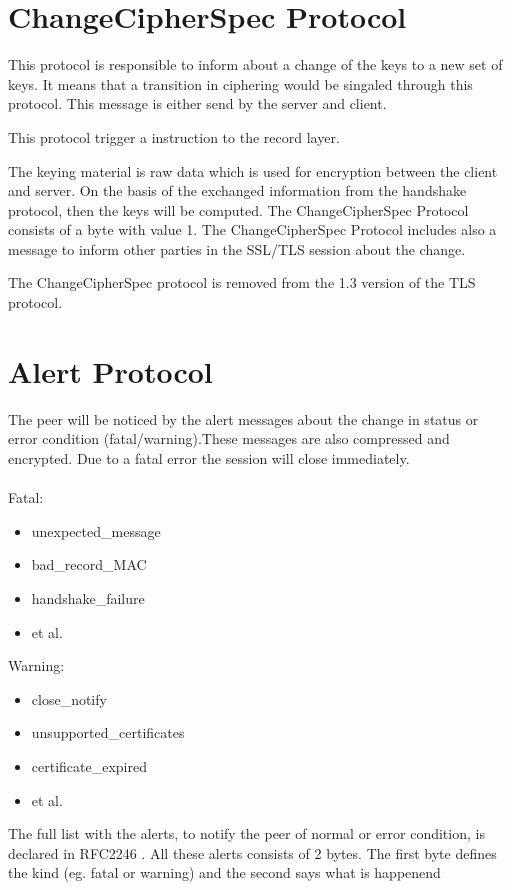 \section{ChangeCipherSpec Protocol}
\label{sec:changeciphfer_protocol}
This protocol is responsible to inform about a change of the keys to a new set of keys. It means that a transition in ciphering would be singaled through this protocol. This message is either send by the server and client. 

This protocol trigger a instruction to the record layer.

The keying material is raw data which is used for encryption between the client and server. On the basis of the exchanged information from the handshake protocol, then the keys will be computed.
The ChangeCipherSpec Protocol consists of a byte with value 1.
The ChangeCipherSpec Protocol includes also a message to inform other parties in the SSL/TLS session about the change.   \cite{ms:overview}

The ChangeCipherSpec protocol is removed from the 1.3 version of the TLS protocol.

\section{Alert Protocol}
\label{sec:alert_protocol}
The peer will be noticed by the alert messages about the change in status or error condition (fatal/warning).These messages are also compressed and encrypted. Due to a fatal error the session will close immediately.\\\\ 
Fatal:
\begin{itemize}
	\item unexpected\_message
	 \item bad\_record\_MAC
	 \item handshake\_failure 
	 \item et al.

	\end{itemize}
	
Warning:
\begin{itemize}
\item close\_notify
\item unsupported\_certificates
\item certificate\_expired
\item et al.


\end{itemize}

The full list with the alerts, to notify the peer of normal or error condition, is declared in RFC2246 \cite{rfc2246}. All these alerts consists of 2 bytes. The first byte defines the kind (eg. fatal or warning) and the second says what is happenend \cite{W.Stalling} \cite{ms:overview}


